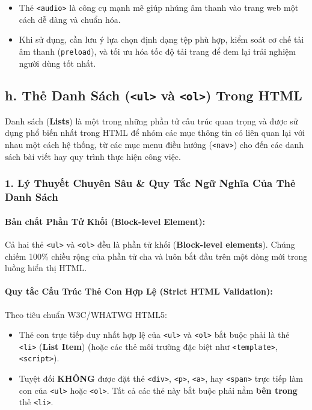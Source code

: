\documentclass[11pt,oneside]{book}
\newcommand{\codeinline}[1]{\textcolor{accentOrange}{\texttt{#1}}}
\newcommand{\term}[1]{\textbf{\textcolor{primaryBlue}{#1}}}
\begin{document}
\begin{conceptBox}
\begin{itemize}[leftmargin=1.5em, itemsep=3pt, parsep=0pt]
    \item Thẻ \codeinline{<audio>} là công cụ mạnh mẽ giúp nhúng âm thanh vào trang web một cách dễ dàng và chuẩn hóa.
    \item Khi sử dụng, cần lưu ý lựa chọn định dạng tệp phù hợp, kiểm soát cơ chế tải âm thanh (\codeinline{preload}), và tối ưu hóa tốc độ tải trang để đem lại trải nghiệm người dùng tốt nhất.
\end{itemize}
\end{conceptBox}

\subsection{h. Thẻ Danh Sách (\codeinline{<ul>} và \codeinline{<ol>}) Trong HTML}

Danh sách (\term{Lists}) là một trong những phần tử cấu trúc quan trọng và được sử dụng phổ biến nhất trong HTML để nhóm các mục thông tin có liên quan lại với nhau một cách hệ thống, từ các mục menu điều hướng (\codeinline{<nav>}) cho đến các danh sách bài viết hay quy trình thực hiện công việc.

\subsubsection{1. Lý Thuyết Chuyên Sâu \& Quy Tắc Ngữ Nghĩa Của Thẻ Danh Sách}

\paragraph{Bản chất Phần Tử Khối (Block-level Element):}
Cả hai thẻ \codeinline{<ul>} và \codeinline{<ol>} đều là phần tử khối (\term{Block-level elements}). Chúng chiếm 100\% chiều rộng của phần tử cha và luôn bắt đầu trên một dòng mới trong luồng hiển thị HTML.

\paragraph{Quy tắc Cấu Trúc Thẻ Con Hợp Lệ (Strict HTML Validation):}
\begin{warnBox}
Theo tiêu chuẩn W3C/WHATWG HTML5:
\begin{itemize}[leftmargin=1.5em, itemsep=3pt, parsep=0pt]
    \item Thẻ con trực tiếp duy nhất hợp lệ của \codeinline{<ul>} và \codeinline{<ol>} bắt buộc phải là thẻ \codeinline{<li>} (\term{List Item}) (hoặc các thẻ môi trường đặc biệt như \codeinline{<template>}, \codeinline{<script>}).
    \item Tuyệt đối \textbf{KHÔNG} được đặt thẻ \codeinline{<div>}, \codeinline{<p>}, \codeinline{<a>}, hay \codeinline{<span>} trực tiếp làm con của \codeinline{<ul>} hoặc \codeinline{<ol>}. Tất cả các thẻ này bắt buộc phải nằm \textbf{bên trong} thẻ \codeinline{<li>}.
\end{itemize}
\end{warnBox}
\end{document}
